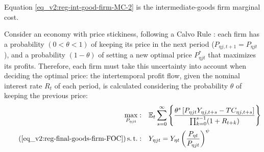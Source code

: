 \documentclass[../thesis.tex]{subfiles}
\begin{document}
Equation \ref{eq_v2:reg-int-good-firm-MC-2} is the intermediate-goods firm marginal cost.

\begin{comment}
	
As salaries and technology are the same for all firms in region $\eta$, the $j$ index can be dropped from the marginal cost $\Lambda$:
\begin{alignat}{2}
	\Lambda_{\eta t} = \frac{W_{\eta t}}{Z_{A\eta t}} \label{eq_v2:reg-int-good-firm-prod-function}
\end{alignat}

Notice that:
\begin{align}
	TC_{\eta jt} &= W_{\eta t} L_{\eta jt} = \Lambda_{\eta t} Y_{\eta jt} 
	MC_{\eta jt} &= \frac{\partial TC_{\eta jt}}{\partial Y_{\eta jt}} = \Lambda_{\eta t} \nonumber
\end{align}

\end{comment}



Consider an economy with price stickiness, following a Calvo Rule \cite{calvo_staggered_1983}: each firm has a probability $(0 < \theta < 1)$ of keeping its price in the next period ($P_{\eta j,t+1} = P_{\eta jt}$), and a probability $(1 - \theta)$ of setting a new optimal price $P_{\eta jt}^{\ast}$ that maximizes its profits. Therefore, each firm must take this uncertainty into account when deciding the optimal price: the intertemporal profit flow, given the nominal interest rate $R_{t}$ of each period, is calculated considering the probability $\theta$ of keeping the previous price:
\begin{align}
	\label{eq_v2:reg-int-good-firm-optimal-price-problem}
	\max_{P_{\eta jt}}: & \quad \E \sum_{s=0}^{\infty} \left\{ \frac{ \theta^s \left[ P_{\eta jt} Y_{\eta j,t+s} - TC_{\eta j,t+s} \right]}{\prod_{k=0}^{s-1}(1+R_{t+k})} \right\} \\
	\tag{\ref{eq_v2:reg-final-goods-firm-FOC}}
	\st: & \quad Y_{\eta jt} = Y_{\eta t} \left( \frac{P_{\eta t}}{P_{\eta jt}} \right)^{\psi}
\end{align}
\end{document}
